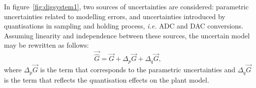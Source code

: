 \documentclass{sig-alternate-05-2015}
\newcommand{\red}[1]{{\color{red}#1}}
\begin{document}
%
In figure~\ref{fig:digsystem1}, two sources of uncertainties are considered: parametric uncertainties related to modelling errors, and uncertainties introduced by quantisations in sampling and holding process, {\it i.e.} ADC and DAC conversions. Assuming linearity and independence between these sources, the uncertain model may be rewritten as follows:
\begin{equation}
\label{eq:complete_unc_model}
\vec{\hat{G}}=\vec{G}+\Delta_p \vec{G}+\Delta_q \vec{G},
\end{equation}
%
where $\Delta_p \vec{G}$ is the term that corresponds to the parametric uncertainties and $\Delta_q \vec{G}$ is the term that reflects the quantisation effects on the plant model. %
\end{document}
